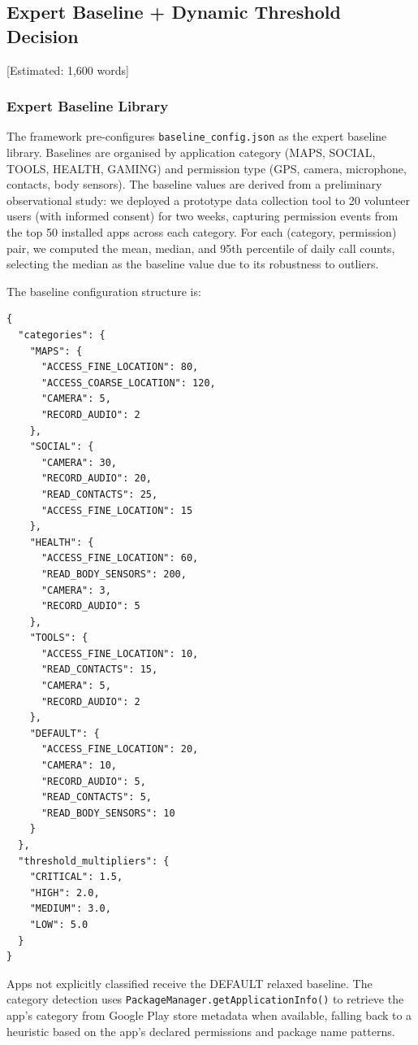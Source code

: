 \subsection{Expert Baseline + Dynamic Threshold Decision} [Estimated: 1,600 words]

\subsubsection{Expert Baseline Library}

The framework pre-configures \texttt{baseline\_config.json} as the expert baseline library. Baselines are organised by application category (MAPS, SOCIAL, TOOLS, HEALTH, GAMING) and permission type (GPS, camera, microphone, contacts, body sensors). The baseline values are derived from a preliminary observational study: we deployed a prototype data collection tool to 20 volunteer users (with informed consent) for two weeks, capturing permission events from the top 50 installed apps across each category. For each (category, permission) pair, we computed the mean, median, and 95th percentile of daily call counts, selecting the median as the baseline value due to its robustness to outliers.

The baseline configuration structure is:

\begin{lstlisting}[caption=baseline\_config.json structure]
{
  "categories": {
    "MAPS": {
      "ACCESS_FINE_LOCATION": 80,
      "ACCESS_COARSE_LOCATION": 120,
      "CAMERA": 5,
      "RECORD_AUDIO": 2
    },
    "SOCIAL": {
      "CAMERA": 30,
      "RECORD_AUDIO": 20,
      "READ_CONTACTS": 25,
      "ACCESS_FINE_LOCATION": 15
    },
    "HEALTH": {
      "ACCESS_FINE_LOCATION": 60,
      "READ_BODY_SENSORS": 200,
      "CAMERA": 3,
      "RECORD_AUDIO": 5
    },
    "TOOLS": {
      "ACCESS_FINE_LOCATION": 10,
      "READ_CONTACTS": 15,
      "CAMERA": 5,
      "RECORD_AUDIO": 2
    },
    "DEFAULT": {
      "ACCESS_FINE_LOCATION": 20,
      "CAMERA": 10,
      "RECORD_AUDIO": 5,
      "READ_CONTACTS": 5,
      "READ_BODY_SENSORS": 10
    }
  },
  "threshold_multipliers": {
    "CRITICAL": 1.5,
    "HIGH": 2.0,
    "MEDIUM": 3.0,
    "LOW": 5.0
  }
}
\end{lstlisting}

Apps not explicitly classified receive the DEFAULT relaxed baseline. The category detection uses \texttt{PackageManager.getApplicationInfo()} to retrieve the app's category from Google Play store metadata when available, falling back to a heuristic based on the app's declared permissions and package name patterns.

